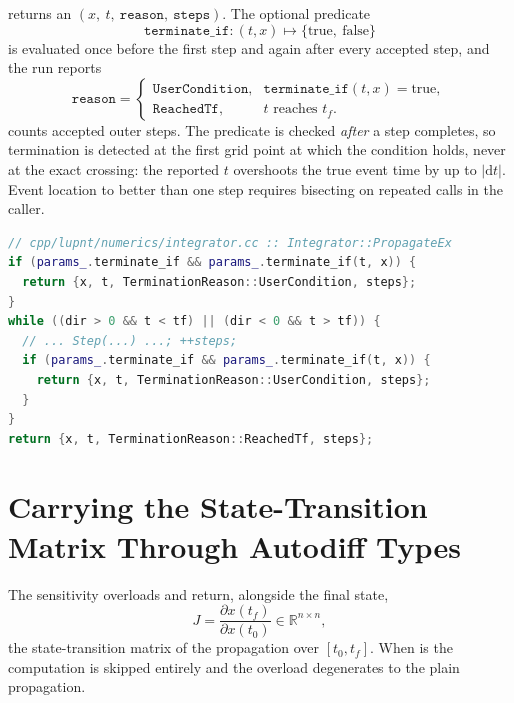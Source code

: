  returns an 
$(x,\ t,\ \texttt{reason},\ \texttt{steps})$. The optional predicate
\begin{equation}
  \label{eq:int-terminate}
  \texttt{terminate\_if} : (t, x) \mapsto \{\text{true},\ \text{false}\}
\end{equation}
is evaluated once before the first step and again after every accepted step,
and the run reports
\begin{equation}
  \label{eq:int-reason}
  \texttt{reason} =
  \begin{cases}
    \texttt{UserCondition}, & \texttt{terminate\_if}(t,x) = \text{true},\\
    \texttt{ReachedTf},     & t \text{ reaches } t_f .
  \end{cases}
\end{equation}
 counts accepted outer steps. The predicate is checked \emph{after}
a step completes, so termination is detected at the first grid point at which
the condition holds, never at the exact crossing: the reported $t$ overshoots
the true event time by up to $|\mathrm{d}t|$. Event location to better than
one step requires bisecting on repeated  calls in the caller.

\begin{lstlisting}[language=cpp, caption={Termination predicate placement. Source: \code{cpp/lupnt/numerics/integrator.cc}}, label={lst:int-term}]
// cpp/lupnt/numerics/integrator.cc :: Integrator::PropagateEx
if (params_.terminate_if && params_.terminate_if(t, x)) {
  return {x, t, TerminationReason::UserCondition, steps};
}
while ((dir > 0 && t < tf) || (dir < 0 && t > tf)) {
  // ... Step(...) ...; ++steps;
  if (params_.terminate_if && params_.terminate_if(t, x)) {
    return {x, t, TerminationReason::UserCondition, steps};
  }
}
return {x, t, TerminationReason::ReachedTf, steps};
\end{lstlisting}

\section{Carrying the State-Transition Matrix Through Autodiff Types}
\label{sec:int-stm}

The sensitivity overloads  and
 return, alongside the final state,
\begin{equation}
  \label{eq:int-jac}
  J = \frac{\partial x(t_f)}{\partial x(t_0)} \in \mathbb{R}^{n\times n},
\end{equation}
the state-transition matrix of the propagation over $[t_0, t_f]$. When
 is  the computation is skipped entirely and the
overload degenerates to the plain propagation.

